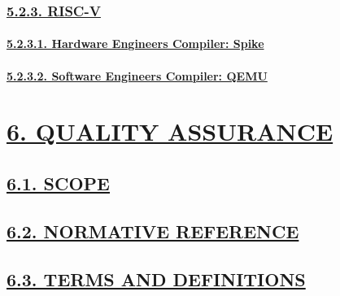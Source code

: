 \documentclass[
]{article}
\begin{document}
\hypertarget{risc-v-2}{%
\subsubsection{\texorpdfstring{\protect\hyperlink{risc-v-5}{5.2.3.
RISC-V}}{5.2.3. RISC-V}}\label{risc-v-2}}

\hypertarget{hardware-engineers-compiler-spike}{%
\paragraph{\texorpdfstring{\protect\hyperlink{hardware-engineers-compiler-spike-1}{5.2.3.1.
Hardware Engineers Compiler:
Spike}}{5.2.3.1. Hardware Engineers Compiler: Spike}}\label{hardware-engineers-compiler-spike}}

\hypertarget{software-engineers-compiler-qemu}{%
\paragraph{\texorpdfstring{\protect\hyperlink{software-engineers-compiler-qemu-1}{5.2.3.2.
Software Engineers Compiler:
QEMU}}{5.2.3.2. Software Engineers Compiler: QEMU}}\label{software-engineers-compiler-qemu}}

\hypertarget{quality-assurance}{%
\section{\texorpdfstring{\protect\hyperlink{quality-assurance-1}{6.
QUALITY ASSURANCE}}{6. QUALITY ASSURANCE}}\label{quality-assurance}}

\hypertarget{scope}{%
\subsection{\texorpdfstring{\protect\hyperlink{scope-1}{6.1.
SCOPE}}{6.1. SCOPE}}\label{scope}}

\hypertarget{normative-reference}{%
\subsection{\texorpdfstring{\protect\hyperlink{normative-reference-1}{6.2.
NORMATIVE
REFERENCE}}{6.2. NORMATIVE REFERENCE}}\label{normative-reference}}

\hypertarget{terms-and-definitions}{%
\subsection{\texorpdfstring{\protect\hyperlink{terms-and-definitions-1}{6.3.
TERMS AND
DEFINITIONS}}{6.3. TERMS AND DEFINITIONS}}\label{terms-and-definitions}}
\end{document}

